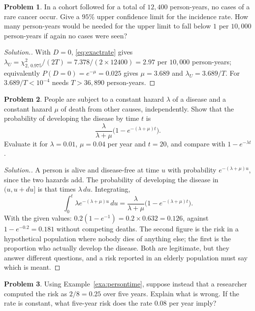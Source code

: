\documentclass[11pt,a4paper]{article}
\numberwithin{equation}{section}
\theoremstyle{definition}
\newtheorem{problemx}{Problem}[subsection]
\newenvironment{problem}{\begin{problemx}}{\end{problemx}}
\newenvironment{solution}
  {\renewcommand{\qedsymbol}{}\begin{proof}[\textit{Solution}.]}
  {\end{proof}}
\begin{document}
\begin{problem}
In a cohort followed for a total of $12{,}400$ person-years, no cases of a rare cancer occur. Give a $95\%$ upper confidence limit for
the incidence rate. How many person-years would be needed for the upper limit to fall below $1$ per $10{,}000$ person-years if again no
cases were seen?
\end{problem}

\begin{solution}
With $D = 0$, \eqref{eq:exactrate} gives $\lambda_U = \chi^2_{2,\,0.975}/(2T) = 7.378/(2 \times 12400) = 2.97$ per $10{,}000$ person-years; equivalently $P(D = 0) = e^{-\mu} = 0.025$
gives $\mu = 3.689$ and $\lambda_U = 3.689/T$. For $3.689/T < 10^{-4}$ needs $T > 36{,}890$ person-years.
\end{solution}

\begin{problem}
\label{prob:compete}
People are subject to a constant hazard $\lambda$ of a disease and a constant hazard $\mu$ of death from other causes, independently. Show that
the probability of developing the disease by time $t$ is
\[
\frac{\lambda}{\lambda + \mu}\bigl(1 - e^{-(\lambda + \mu)t}\bigr) .
\]
Evaluate it for $\lambda = 0.01$, $\mu = 0.04$ per year and $t = 20$, and compare with $1 - e^{-\lambda t}$.
\end{problem}

\begin{solution}
A person is alive and disease-free at time $u$ with probability $e^{-(\lambda + \mu)u}$, since the two hazards add. The probability of developing the
disease in $(u, u + du]$ is that times $\lambda\,du$. Integrating,
\[
\int_0^t \lambda e^{-(\lambda + \mu)u}\,du = \frac{\lambda}{\lambda + \mu}\bigl(1 - e^{-(\lambda + \mu)t}\bigr) .
\]
With the given values: $0.2(1 - e^{-1}) = 0.2 \times 0.632 = 0.126$, against $1 - e^{-0.2} = 0.181$ without competing deaths. The second figure is the risk in a
hypothetical population where nobody dies of anything else; the first is the proportion who actually develop the disease. Both are
legitimate, but they answer different questions, and a risk reported in an elderly population must say which is meant.
\end{solution}

\begin{problem}
Using Example~\ref{exa:persontime}, suppose instead that a researcher computed the risk as $2/8 = 0.25$ over five years. Explain what is
wrong. If the rate is constant, what five-year risk does the rate $0.08$ per year imply?
\end{problem}
\end{document}
